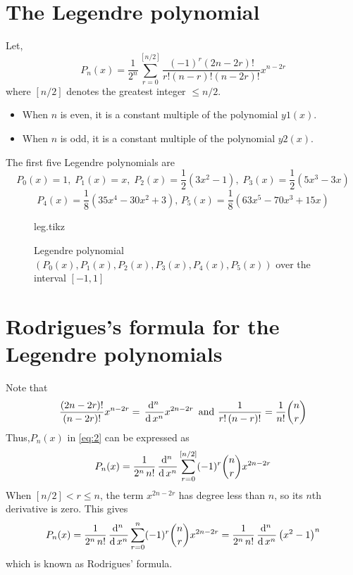 \documentclass[../main-sheet.tex]{subfiles}
\begin{document}
\section{The Legendre polynomial}
Let,
\begin{equation}
    P_n(x )=\frac{1}{2^n}\sum_{r=0}^{[n/2]}\frac{(-1)^r (2n - 2r )!}{r !(n - r )!(n - 2r )!}x^{n-2r} \label{eq:2}
\end{equation}
where $ [n/2] $ denotes the greatest integer $ \leq n/2. $
\begin{itemize}
    \item When $ n $ is even, it is a constant multiple of the polynomial $ y1(x ) $.
    \item When $ n $ is odd, it is a constant multiple of the polynomial
    $ y2(x ) $.
\end{itemize}
The first five Legendre polynomials are
\[
    P_0(x ) = 1,\; P_1(x ) = x,\;P_2(x ) =\frac{1}{2}\left(3x^2 - 1\right),\; P_3(x)=\frac{1}{2}\left( 5x^3-3x \right)
\]
\[
    P_4(x ) =\frac{1}{8}\left(35x^4 - 30x^2 + 3\right),\,P_5(x ) =\frac{1}{8}\left(63x^5 - 70x^3 + 15x \right)
\]
\begin{figure}[H]
    \centering
    {leg.tikz}
    \caption{Legendre polynomial $ (P_0(x),P_1(x),P_2(x),P_3(x),P_4(x),P_5(x)) $ over the interval $ [-1, 1] $}
\end{figure}
\section{Rodrigues's formula for the Legendre polynomials}
Note that
\[
    \frac{(2n - 2r )!}{(n-2r)!}x^{n-2r}=\,\frac{\mathrm{d}^{n}\, }{\mathrm{d}\, x^{n}}x^{2n-2r}\,\text{ and } \frac{1}{r!\,(n - r )!}=\frac{1}{n!}\binom{n}{r}
\]
Thus,$  P_n(x ) $ in \eqref{eq:2} can be expressed as
\[
    P_n(x ) =\frac{1}{2^n\,n!}\,\frac{\mathrm{d}^{n}\, }{\mathrm{d}\, x^{n}}\sum_{r=0}^{[n/2]}(-1)^r\binom{n}{r}x^{2n-2r}
\]
When $ [n/2] < r\leq n $, the term $ x^{2n-2r}  $ has degree less than $ n $, so its $ n $th derivative is zero. This gives
\[
    P_n(x ) =\frac{1}{2^n\,n!}\,\frac{\mathrm{d}^{n}\, }{\mathrm{d}\, x^{n}}\sum_{r=0}^{n}(-1)^r\binom{n}{r}x^{2n-2r}=\frac{1}{2^n\,n!}\,\frac{\mathrm{d}^{n}\, }{\mathrm{d}\, x^{n}}\left( x^2-1 \right)^n
\]
which is known as Rodrigues' formula.
\end{document}
